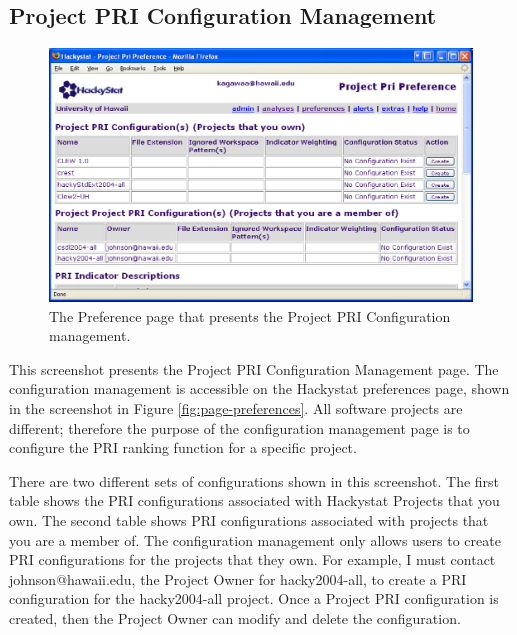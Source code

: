 \subsection{Project PRI Configuration Management}
\label{subsection:configurationManagement}
\begin{figure}[ht]
  \centering
  \includegraphics[width=1.00\textwidth]{figs/UserInterface/preference-config-kagawaa.eps}
  \caption[Project PRI Configuration Management preference page]{The
    Preference page that presents the Project PRI Configuration management.}
  \label{fig:preference-config-kagawaa}
\end{figure}
This screenshot presents the Project PRI Configuration Management page. The
configuration management is accessible on the Hackystat preferences page,
shown in the screenshot in Figure \ref{fig:page-preferences}. All software
projects are different; therefore the purpose of the configuration
management page is to configure the PRI ranking function for a specific
project.

There are two different sets of configurations shown in this screenshot.
The first table shows the PRI configurations associated with Hackystat
Projects that you own. The second table shows PRI configurations associated
with projects that you are a member of. The configuration management only
allows users to create PRI configurations for the projects that they own.
For example, I must contact johnson@hawaii.edu, the Project Owner for
hacky2004-all, to create a PRI configuration for the hacky2004-all project.
Once a Project PRI configuration is created, then the Project Owner can
modify and delete the configuration.



